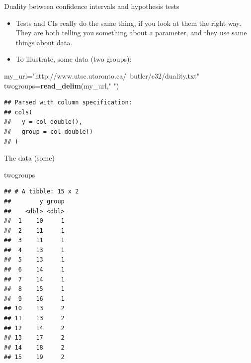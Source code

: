 \documentclass[ignorenonframetext,]{beamer}
\newenvironment{Shaded}{\begin{snugshade}}{\end{snugshade}}
\newcommand{\KeywordTok}[1]{\textcolor[rgb]{0.13,0.29,0.53}{\textbf{#1}}}
\newcommand{\NormalTok}[1]{#1}
\newcommand{\StringTok}[1]{\textcolor[rgb]{0.31,0.60,0.02}{#1}}
\providecommand{\tightlist}{%
  \setlength{\itemsep}{0pt}\setlength{\parskip}{0pt}}
\begin{document}
\begin{frame}[fragile]{Duality between confidence intervals and
hypothesis tests}
\protect\hypertarget{duality-between-confidence-intervals-and-hypothesis-tests}{}

\begin{itemize}
\tightlist
\item
  Tests and CIs really do the same thing, if you look at them the right
  way. They are both telling you something about a parameter, and they
  use same things about data.
\item
  To illustrate, some data (two groups):
\end{itemize}

\begin{Shaded}
\begin{Highlighting}[]
\NormalTok{my_url=}\StringTok{"http://www.utsc.utoronto.ca/~butler/c32/duality.txt"}
\NormalTok{twogroups=}\KeywordTok{read_delim}\NormalTok{(my_url,}\StringTok{" "}\NormalTok{)}
\end{Highlighting}
\end{Shaded}

\begin{verbatim}
## Parsed with column specification:
## cols(
##   y = col_double(),
##   group = col_double()
## )
\end{verbatim}

\end{frame}

\begin{frame}[fragile]{The data (some)}
\protect\hypertarget{the-data-some-2}{}

\begin{Shaded}
\begin{Highlighting}[]
\NormalTok{twogroups}
\end{Highlighting}
\end{Shaded}

\begin{verbatim}
## # A tibble: 15 x 2
##        y group
##    <dbl> <dbl>
##  1    10     1
##  2    11     1
##  3    11     1
##  4    13     1
##  5    13     1
##  6    14     1
##  7    14     1
##  8    15     1
##  9    16     1
## 10    13     2
## 11    13     2
## 12    14     2
## 13    17     2
## 14    18     2
## 15    19     2
\end{verbatim}

\end{frame}
\end{document}
